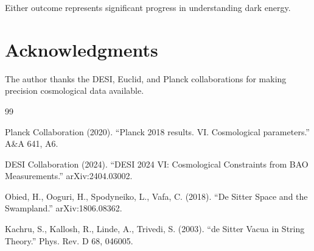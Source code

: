 \documentclass[12pt,a4paper]{article}
\begin{document}
Either outcome represents significant progress in understanding dark energy.

\section*{Acknowledgments}

The author thanks the DESI, Euclid, and Planck collaborations for making precision cosmological data available.

\begin{thebibliography}{99}

Planck Collaboration (2020). ``Planck 2018 results. VI. Cosmological parameters.'' A\&A 641, A6.

DESI Collaboration (2024). ``DESI 2024 VI: Cosmological Constraints from BAO Measurements.'' arXiv:2404.03002.

Obied, H., Ooguri, H., Spodyneiko, L., Vafa, C. (2018). ``De Sitter Space and the Swampland.'' arXiv:1806.08362.

Kachru, S., Kallosh, R., Linde, A., Trivedi, S. (2003). ``de Sitter Vacua in String Theory.'' Phys. Rev. D 68, 046005.

\end{thebibliography}
\end{document}
